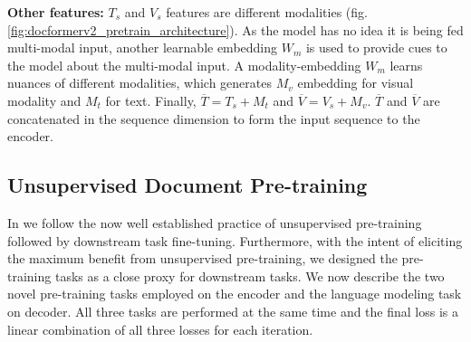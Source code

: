\documentclass[10pt,twocolumn,letterpaper]{article}
\begin{document}
\label{sec:approach:arch:other}
\noindent\textbf{Other features:} $T_s$ and $V_s$ features are different modalities (fig. \ref{fig:docformerv2_pretrain_architecture}). As the model has no idea it is being fed multi-modal input, another learnable embedding $W_m$ is used to provide cues to the model about the multi-modal input. A modality-embedding $W_m$ learns nuances of different modalities, which generates $M_v$ embedding for visual modality and $M_t$ for text. Finally, $\overline{T} = T_s + M_t $ and $\overline{V} = V_s + M_v $. $\overline{T}$ and $\overline{V}$ are concatenated in the sequence dimension to form the input sequence to the \papertitleshort encoder.

\begin{table}
\centering
{}
\caption{\textbf{\papertitle variants}: dim is embedding dimensionality. ff is output dim of feed-forward layer. E is encoder and D is decoder. attn. H is attention heads.
}
\label{table:dfv2_variants}
\vspace{-0.6cm}
\end{table}

\subsection{Unsupervised Document Pre-training}
\label{sec:approach:pretrain}

In \papertitle we follow the now well established practice of unsupervised pre-training followed by downstream task fine-tuning. Furthermore, with the intent of eliciting the maximum benefit from unsupervised pre-training, we designed the pre-training tasks as a close proxy for downstream tasks. We now describe the two novel pre-training tasks employed on the encoder and the language modeling task on decoder. All three tasks are performed at the same time and the final loss is a linear combination of all three losses for each iteration.
\end{document}
